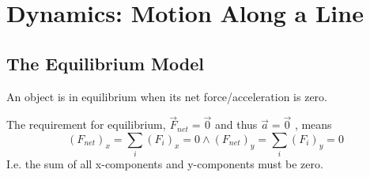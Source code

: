 \section{Dynamics:  Motion Along a Line}

\subsection{The Equilibrium Model}
\begin{definition}[Equilibrium]
    An object is in equilibrium when its net force/acceleration is zero.
\end{definition}
The requirement for equilibrium,
$
    \vec{F}_{net} = \vec{0}
$ and thus
$
    \vec{a}=\vec{0}
$%
, means
\begin{equation}
    (F_{net})_x=\sum_i(F_i)_x=0 \wedge (F_{net})_y=\sum_i(F_i)_y=0
\end{equation}
I.e. the sum of all x-components and y-components must be zero.

